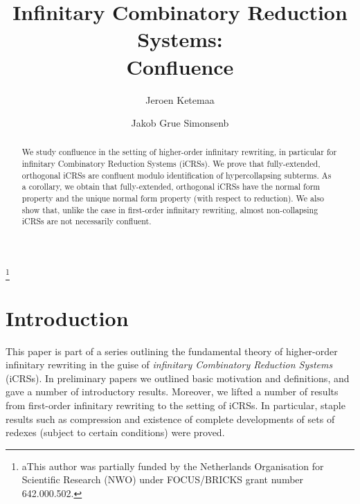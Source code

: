 \documentclass{LMCS}
\theoremstyle{plain}
\theoremstyle{definition}
\begin{document}
 
\title[Infinitary Combinatory Reduction Systems: Confluence]{Infinitary Combinatory Reduction Systems:\\
Confluence\rsuper*}

\author[J.~Ketema]{Jeroen Ketema\rsuper a}
\address{{\lsuper a}Research Institute of Electrical Communication, Tohoku University\\
2-1-1 Katahira, Aoba-ku, Sendai 980-8577, Japan}
\thanks{{\lsuper a}This author was partially funded by the Netherlands Organisation for Scientific Research (NWO) under FOCUS/BRICKS grant number 642.000.502.}

\author[J.~G.~Simonsen]{Jakob Grue Simonsen\rsuper b}
\address{{\lsuper b}Department of Computer Science, University of Copenhagen (DIKU)\\
Universitetsparken 1, 2100 Copenhagen \O, Denmark}


\begin{abstract}
We study confluence in the setting of higher-order infinitary rewriting, in particular for infinitary Combinatory Reduction Systems (iCRSs). We prove that 
fully-extended, orthogonal iCRSs are confluent modulo identification of hypercollapsing subterms. As a corollary, we obtain that fully-extended, orthogonal iCRSs have the normal form property and the unique normal form property (with respect to reduction). We also show that, unlike the case in first-order infinitary rewriting, almost non-collapsing iCRSs are not necessarily confluent.
\end{abstract}

\maketitle

\tableofcontents

\section{Introduction}

\noindent This paper is part of a series outlining the fundamental
theory of higher-order infinitary rewriting in the guise of
\emph{infinitary Combinatory Reduction Systems} (iCRSs). In
preliminary papers \cite{JJ05a,JJ05b} we outlined basic motivation and
definitions, and gave a number of introductory results. Moreover, we
lifted a number of results from first-order infinitary rewriting to
the setting of iCRSs. In particular, staple results such as
compression and existence of complete developments of sets of redexes
(subject to certain conditions) were proved.
\end{document}
